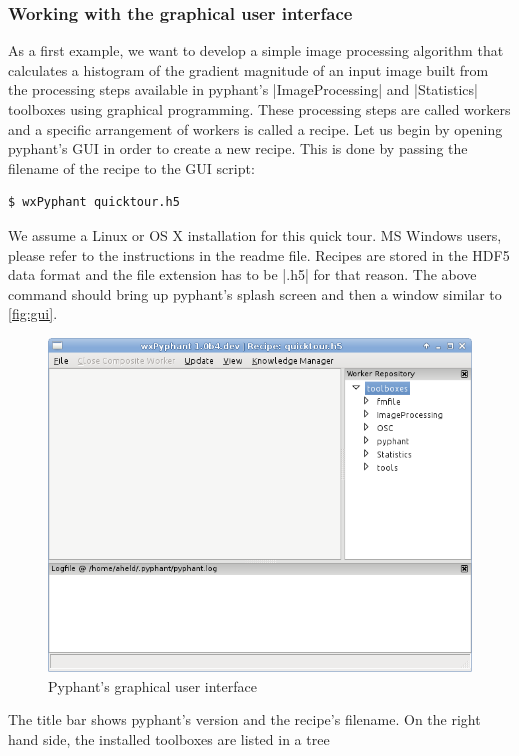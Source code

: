\documentclass[a4paper]{article}
\begin{document}
\subsubsection{Working with the graphical user interface}
\label{sec:introduction_gui}

As a first example, we want to develop a simple image processing
algorithm that calculates a histogram of the gradient magnitude of an
input image built from the processing steps available in pyphant's
|ImageProcessing| and |Statistics| toolboxes using graphical
programming. These processing steps are called workers and a specific
arrangement of workers is called a recipe. Let us begin by opening
pyphant's GUI in order to create a new recipe. This is done by passing
the filename of the recipe to the GUI script:
\begin{lstlisting}[style=terminal]
$ wxPyphant quicktour.h5
\end{lstlisting}
We assume a Linux or OS X installation for this quick tour. MS Windows
users, please refer to the instructions in the readme
file\cite{wingui}. Recipes are stored in the HDF5\cite{hdf5} data
format and the file extension has to be |.h5| for that
reason. The above command should bring up pyphant's splash
screen and then a window similar to \autoref{fig:gui}.
\begin{figure}[h]
  \centering
  \includegraphics[scale=0.75]{fig/gui.png}
  \caption{Pyphant's graphical user interface}
  \label{fig:gui}
\end{figure}
The title bar shows pyphant's version and the recipe's filename. On
the right hand side, the installed toolboxes are listed in a tree
\end{document}
